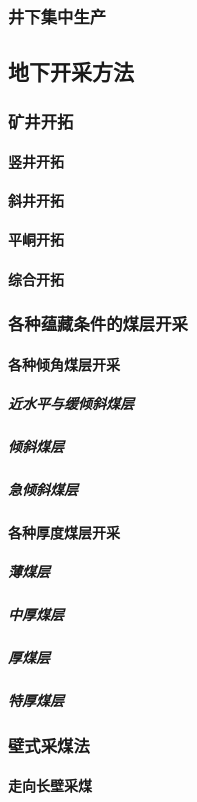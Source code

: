 \documentclass[UTF8]{../../ApplicationUniverse}
\begin{document}
        \subsubsection{井下集中生产}
    \subsection{地下开采方法}
        \subsubsection{矿井开拓}
            \paragraph{竖井开拓}
            \paragraph{斜井开拓}
            \paragraph{平峒开拓}
            \paragraph{综合开拓}
        \subsubsection{各种蕴藏条件的煤层开采}
            \paragraph{各种倾角煤层开采}
                \subparagraph{近水平与缓倾斜煤层}
                \subparagraph{倾斜煤层}
                \subparagraph{急倾斜煤层}
            \paragraph{各种厚度煤层开采}
                \subparagraph{薄煤层}
                \subparagraph{中厚煤层}
                \subparagraph{厚煤层}
                \subparagraph{特厚煤层}
        \subsubsection{壁式采煤法}
            \paragraph{走向长壁采煤}
\end{document}
